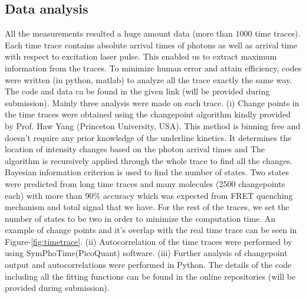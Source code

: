 \documentclass[journal=jacsat,manuscript=article]{achemso}
\begin{document}
\subsection{Data analysis}
All the measurements resulted a huge amount data (more than $1000$ time traces). Each time trace contains absolute arrival times of photons as well as arrival time with respect to excitation laser pulse. This enabled us to extract maximum information from the traces. To minimize human error and attain efficiency, codes were written (in python, matlab) to analyze all the trace exactly the same way. The code and data ca be found in the given link (will be provided during submission). Mainly three analysis were made on each trace. (i) Change points in the time traces were obtained using the changepoint algorithm\cite{watkins2005detection} kindly provided by Prof. Haw Yang (Princeton University, USA). This method is binning free and doesn't require any prior knowledge of the underline kinetics. It determines the location of intensity changes based on the photon arrival times and The algorithm is recursively applied through the whole trace to find all the changes. Bayesian information criterion is used to find the number of states. Two states were predicted from long time traces and many molecules (2500 changepoints each) with more than 90\% accuracy which was expected from FRET quenching mechanism and total signal that we have. For the rest of the traces, we set the number of states to be two in order to minimize the computation time. An example of change points and it's overlap with the real time trace can be seen in Figure-\ref{fig:timetrace}. (ii) Autocorrelation of the time traces were performed by using SymPhoTime(PicoQuant) software. (iii) Further analysis of changepoint output and autocorrelations were performed in Python. The details of the code including all the fitting functions can be found in the online repositories (will be provided during submission).
\end{document}

